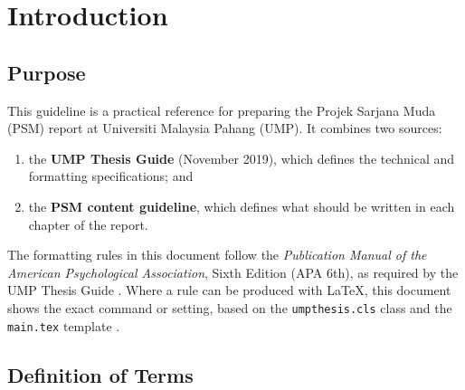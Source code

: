 \chapter{Introduction}

\section{Purpose}

This guideline is a practical reference for preparing the Projek Sarjana Muda (PSM) report at Universiti Malaysia Pahang (UMP). It combines two sources:

\begin{enumerate}
    \item the \textbf{UMP Thesis Guide} (November 2019), which defines the technical and formatting specifications; and
    \item the \textbf{PSM content guideline}, which defines what should be written in each chapter of the report.
\end{enumerate}

The formatting rules in this document follow the \emph{Publication Manual of the American Psychological Association}, Sixth Edition (APA 6th), as required by the UMP Thesis Guide \citep{umpthesis2019}. Where a rule can be produced with \LaTeX{}, this document shows the exact command or setting, based on the \texttt{umpthesis.cls} class and the \texttt{main.tex} template \citep{umpthesiscls}.

\section{Definition of Terms}

